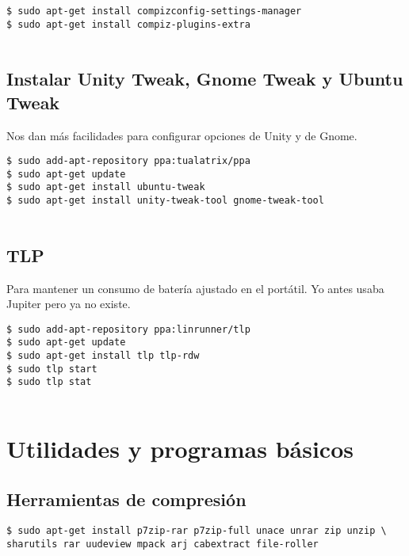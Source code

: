 \begin{verbatim}
$ sudo apt-get install compizconfig-settings-manager
$ sudo apt-get install compiz-plugins-extra
      
\end{verbatim}

\subsection{Instalar Unity Tweak, Gnome Tweak y Ubuntu
Tweak}\label{instalar-unity-tweak-gnome-tweak-y-ubuntu-tweak}

Nos dan más facilidades para configurar opciones de Unity y de Gnome.

\begin{verbatim}
$ sudo add-apt-repository ppa:tualatrix/ppa
$ sudo apt-get update
$ sudo apt-get install ubuntu-tweak
$ sudo apt-get install unity-tweak-tool gnome-tweak-tool
      
\end{verbatim}

\subsection{TLP}\label{tlp}

Para mantener un consumo de batería ajustado en el portátil. Yo antes
usaba Jupiter pero ya no existe.

\begin{verbatim}
$ sudo add-apt-repository ppa:linrunner/tlp
$ sudo apt-get update
$ sudo apt-get install tlp tlp-rdw
$ sudo tlp start
$ sudo tlp stat
      
\end{verbatim}

\section{Utilidades y programas
básicos}\label{utilidades-y-programas-buxe1sicos}

\subsection{Herramientas de
compresión}\label{herramientas-de-compresiuxf3n}

\begin{verbatim}
$ sudo apt-get install p7zip-rar p7zip-full unace unrar zip unzip \
sharutils rar uudeview mpack arj cabextract file-roller
      
\end{verbatim}


